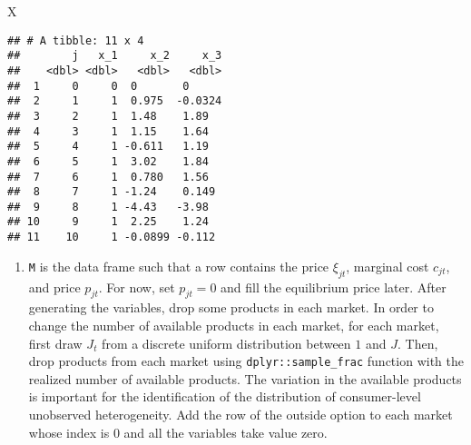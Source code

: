 \documentclass[
]{book}
\newenvironment{Shaded}{\begin{snugshade}}{\end{snugshade}}
\newcommand{\NormalTok}[1]{#1}
\providecommand{\tightlist}{%
  \setlength{\itemsep}{0pt}\setlength{\parskip}{0pt}}
\begin{document}
\begin{Shaded}
\begin{Highlighting}[]
\NormalTok{X}
\end{Highlighting}
\end{Shaded}

\begin{verbatim}
## # A tibble: 11 x 4
##        j   x_1     x_2     x_3
##    <dbl> <dbl>   <dbl>   <dbl>
##  1     0     0  0       0     
##  2     1     1  0.975  -0.0324
##  3     2     1  1.48    1.89  
##  4     3     1  1.15    1.64  
##  5     4     1 -0.611   1.19  
##  6     5     1  3.02    1.84  
##  7     6     1  0.780   1.56  
##  8     7     1 -1.24    0.149 
##  9     8     1 -4.43   -3.98  
## 10     9     1  2.25    1.24  
## 11    10     1 -0.0899 -0.112
\end{verbatim}

\begin{enumerate}
\def\labelenumi{\arabic{enumi}.}
\setcounter{enumi}{2}
\tightlist
\item
  \texttt{M} is the data frame such that a row contains the price \(\xi_{jt}\), marginal cost \(c_{jt}\), and price \(p_{jt}\). For now, set \(p_{jt} = 0\) and fill the equilibrium price later. After generating the variables, drop some products in each market. In order to change the number of available products in each market, for each market, first draw \(J_t\) from a discrete uniform distribution between \(1\) and \(J\). Then, drop products from each market using \texttt{dplyr::sample\_frac} function with the realized number of available products. The variation in the available products is important for the identification of the distribution of consumer-level unobserved heterogeneity. Add the row of the outside option to each market whose index is \(0\) and all the variables take value zero.
\end{enumerate}
\end{document}
